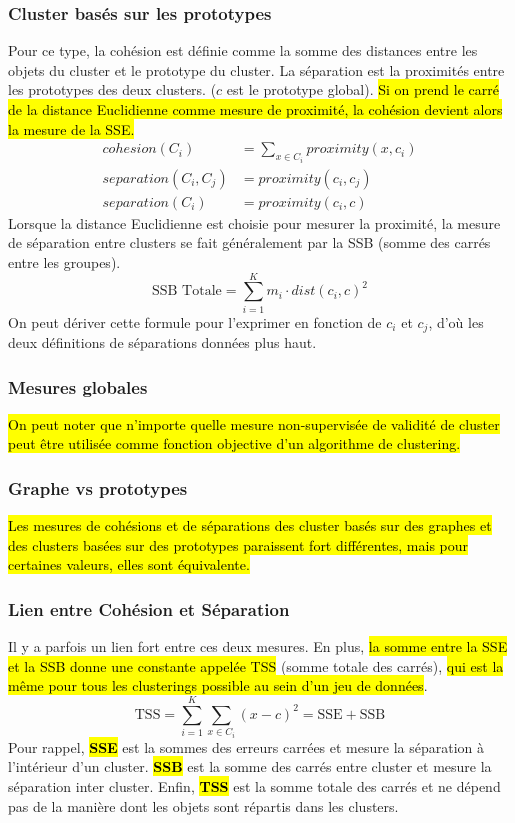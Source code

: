 \documentclass[letterpaper, 12pt]{article}
\newcommand{\alinea}{
\hspace*{0.5cm}}
\begin{document}
			\subsubsection{Cluster basés sur les prototypes}
				\alinea Pour ce type, la cohésion est définie comme
					la somme des distances entre les objets du cluster 
					et le prototype du cluster. La séparation est la 
					proximités entre les prototypes des deux clusters.
					($c$ est le prototype global). \hl{Si on prend
					le carré de la distance Euclidienne comme mesure de 
					proximité, la cohésion devient alors la mesure de la
					SSE.}
					\begin{align*}
						cohesion(C_i) &= \sum_{x\in C_i}
								proximity(x, c_i)\\
						separation(C_i, C_j) &= proximity(c_i, c_j)\\
						separation(C_i) &= proximity(c_i, c)
					\end{align*}
					Lorsque la distance Euclidienne est choisie pour mesurer 
					la proximité, la mesure de séparation entre clusters
					se fait généralement par la SSB (somme des carrés
					entre les groupes).
					$$ \text{SSB Totale} = \sum_{i=1}^{K} m_i \cdot 
							dist(c_i, c)^2 $$
					On peut dériver cette formule pour l'exprimer en 
					fonction de $c_i$ et $c_j$, d'où les deux définitions
					de séparations données plus haut.
			\subsubsection{Mesures globales}
				\alinea \hl{On peut noter que n'importe quelle mesure 
					non-supervisée de validité de cluster peut être utilisée
					comme fonction objective d'un algorithme de clustering.}
			\subsubsection{Graphe vs prototypes}
				\alinea \hl{Les mesures de cohésions et de séparations des 
					cluster basés sur des graphes et des clusters 
					basées sur des prototypes paraissent fort différentes,
					mais pour certaines valeurs, elles sont équivalente.}
			\subsubsection{Lien entre Cohésion et Séparation}
				\alinea Il y a parfois un lien fort entre ces deux
					mesures. En plus, \hl{la somme entre la SSE et la SSB
					donne une constante appelée TSS} (somme totale des
					carrés), \hl{qui est la même pour tous les 
					clusterings possible au sein d'un jeu de données}.
					$$ \text{TSS} = \sum_{i=1}^{K} \sum_{x \in C_i} (x - c)^2
						   = \text{SSE} + \text{SSB} $$
					Pour rappel, \hl{\textbf{SSE}} est la 
					sommes des erreurs carrées et 
					mesure la séparation à l'intérieur 
					d'un cluster. \hl{\textbf{SSB}}
					est la somme des carrés entre cluster et mesure la
					séparation inter cluster. Enfin, 
					\hl{\textbf{TSS}} est la somme 
					totale des carrés et ne dépend pas de la manière
					dont les objets sont répartis dans les clusters.
\end{document}
